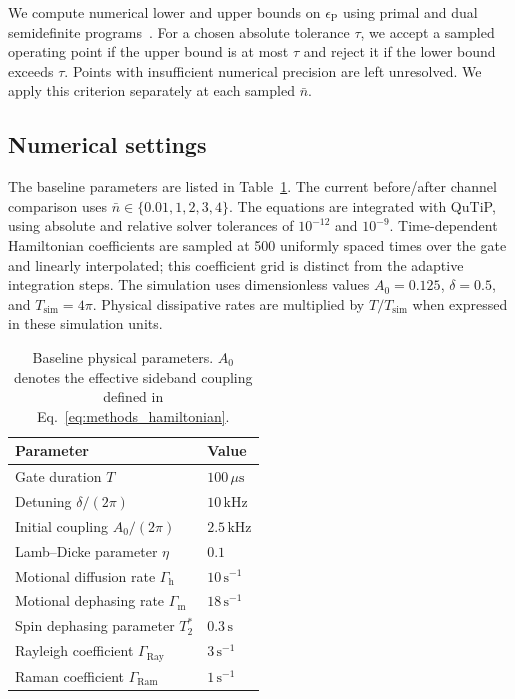 \documentclass[a4paper,11pt]{article}
\begin{document}
We compute numerical lower and upper bounds on $\epsilon_{\mathrm P}$
using primal and dual semidefinite programs~\cite{WatrousDiamond}.
For a chosen absolute tolerance $\tau$, we accept a sampled operating
point if the upper bound is at most $\tau$ and reject it if the lower
bound exceeds $\tau$. Points with insufficient numerical precision
are left unresolved. We apply this criterion separately at each
sampled $\bar n$.

\subsection{Numerical settings}
\label{subsec:numerics}

The baseline parameters are listed in Table~\ref{tab:methods_parameters}.
The current before/after channel comparison uses
$\bar n\in\{0.01,1,2,3,4\}$. The equations are integrated with QuTiP,
using absolute and relative solver tolerances of $10^{-12}$ and
$10^{-9}$. Time-dependent Hamiltonian coefficients are sampled at 500
uniformly spaced times over the gate and linearly interpolated; this
coefficient grid is distinct from the adaptive integration steps.
The simulation uses dimensionless values $A_0=0.125$, $\delta=0.5$, and
$T_{\mathrm{sim}}=4\pi$. Physical dissipative rates are multiplied by
$T/T_{\mathrm{sim}}$ when expressed in these simulation units.

\begin{table}[htbp]
 \centering
 \caption{Baseline physical parameters. $A_0$ denotes the effective
 sideband coupling defined in Eq.~\eqref{eq:methods_hamiltonian}.}
 \label{tab:methods_parameters}
 \begin{tabular}{ll}
  \toprule
  Parameter & Value\\
  \midrule
  Gate duration $T$ & $100\,\mu\mathrm{s}$\\
  Detuning $\delta/(2\pi)$ & $10\,\mathrm{kHz}$\\
  Initial coupling $A_0/(2\pi)$ & $2.5\,\mathrm{kHz}$\\
  Lamb--Dicke parameter $\eta$ & $0.1$\\
  Motional diffusion rate $\Gamma_{\mathrm h}$ & $10\,\mathrm{s}^{-1}$\\
  Motional dephasing rate $\Gamma_{\mathrm m}$ & $18\,\mathrm{s}^{-1}$\\
  Spin dephasing parameter $T_2^*$ & $0.3\,\mathrm{s}$\\
  Rayleigh coefficient $\Gamma_{\mathrm{Ray}}$ & $3\,\mathrm{s}^{-1}$\\
  Raman coefficient $\Gamma_{\mathrm{Ram}}$ & $1\,\mathrm{s}^{-1}$\\
  \bottomrule
 \end{tabular}
\end{table}
\end{document}
